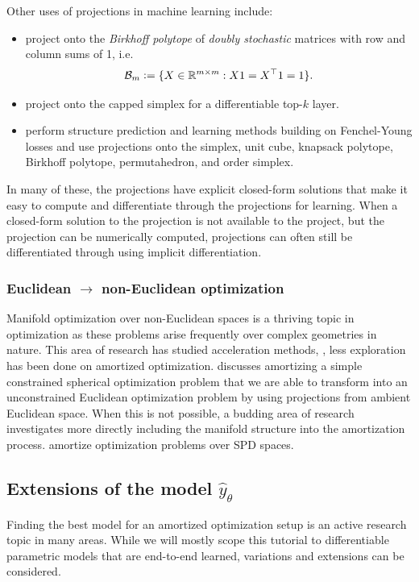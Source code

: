 \documentclass[twoside,11pt]{article}
\newcommand{\ie}{i.e.\xspace}
\begin{document}
\noindent Other uses of projections in machine learning include:
\begin{itemize}
\item \citet{adams2011ranking,santa2017deeppermnet,mena2018learning}
  project onto the \emph{Birkhoff polytope} of
  \emph{doubly stochastic} matrices with row and
  column sums of 1, \ie
  \begin{equation}
    \label{eq:birkhoff}
    {\mathcal{B}}_m\vcentcolon= \{X\in\mathbb{R}^{m\times m}: X1=X^\top1=1\}.
  \end{equation}
\item \citet{amos2019limited} project onto the capped
  simplex for a differentiable top-$k$ layer.
\item \citet{blondel2019structured} perform structure
  prediction and learning methods building on Fenchel-Young losses
  \citep{blondel2020learning} and use projections onto the
  simplex, unit cube, knapsack polytope, Birkhoff polytope,
  permutahedron, and order simplex.
\end{itemize}

In many of these, the projections have explicit closed-form
solutions that make it easy to compute and differentiate
through the projections for learning.
When a closed-form solution to the projection is not available to
the project, but the projection can be numerically computed,
projections can often still be differentiated through using
implicit differentiation.

\subsubsection{Euclidean $\rightarrow$ non-Euclidean optimization}
Manifold optimization \citep{absil2009optimization,hu2019brief}
over non-Euclidean spaces is a thriving topic in optimization
as these problems arise frequently over complex geometries in nature.
This area of research has studied acceleration methods,
\citep{duruisseaux2022accelerated}, less exploration
has been done on amortized optimization.
 discusses amortizing a simple
constrained spherical optimization problem that we are able
to transform into an unconstrained Euclidean optimization
problem by using projections from ambient Euclidean space.
When this is not possible, a budding area of research investigates
more directly including the manifold structure into the
amortization process. \citet{gao2020learning} amortize optimization
problems over SPD spaces.

\subsection{Extensions of the model $\hat y_\theta$}
Finding the best model for an amortized optimization setup
is an active research topic in many areas.
While we will mostly scope this tutorial to differentiable
parametric models that are end-to-end learned,
variations and extensions can be considered.
\end{document}
